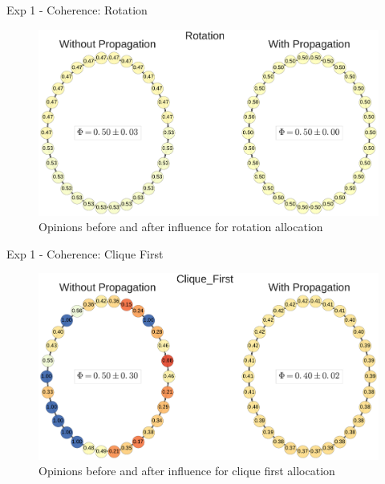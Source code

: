 \begin{frame}{Exp 1 - Coherence: Rotation}

\begin{figure}[htbp]
\centering
\includegraphics{pics/voices_exp1_rotation.pdf}
\caption{Opinions before and after influence for rotation allocation}
\end{figure}

\end{frame}

\begin{frame}{Exp 1 - Coherence: Clique First}

\begin{figure}[htbp]
\centering
\includegraphics{pics/voices_exp1_clique_first.pdf}
\caption{Opinions before and after influence for clique first
allocation}
\end{figure}

\end{frame}


